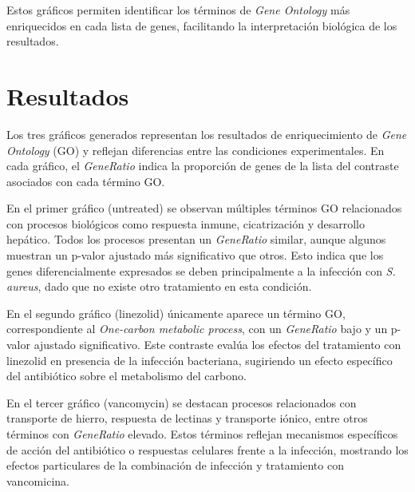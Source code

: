 \documentclass[12pt,a4paper]{article}
\begin{document}
Estos gráficos permiten identificar los términos de \textit{Gene Ontology} más enriquecidos en cada lista de genes, facilitando la interpretación biológica de los resultados.








\section{Resultados}

Los tres gráficos generados representan los resultados de enriquecimiento de \textit{Gene Ontology} (GO) y reflejan diferencias entre las condiciones experimentales. En cada gráfico, el \textit{GeneRatio} indica la proporción de genes de la lista del contraste asociados con cada término GO.

En el primer gráfico (untreated) se observan múltiples términos GO relacionados con procesos biológicos como respuesta inmune, cicatrización y desarrollo hepático. Todos los procesos presentan un \textit{GeneRatio} similar, aunque algunos muestran un p-valor ajustado más significativo que otros. Esto indica que los genes diferencialmente expresados se deben principalmente a la infección con \textit{S. aureus}, dado que no existe otro tratamiento en esta condición.

En el segundo gráfico (linezolid) únicamente aparece un término GO, correspondiente al \textit{One-carbon metabolic process}, con un \textit{GeneRatio} bajo y un p-valor ajustado significativo. Este contraste evalúa los efectos del tratamiento con linezolid en presencia de la infección bacteriana, sugiriendo un efecto específico del antibiótico sobre el metabolismo del carbono.

En el tercer gráfico (vancomycin) se destacan procesos relacionados con transporte de hierro, respuesta de lectinas y transporte iónico, entre otros términos con \textit{GeneRatio} elevado. Estos términos reflejan mecanismos específicos de acción del antibiótico o respuestas celulares frente a la infección, mostrando los efectos particulares de la combinación de infección y tratamiento con vancomicina.
\end{document}
